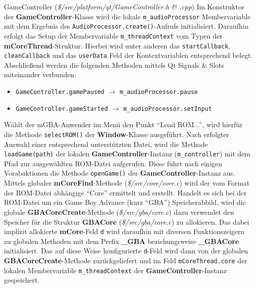 \documentclass[11pt,a4paper]{scrartcl}
\newcommand{\AutorDominik} {
    \vspace{-4mm}
    \large \textbf{Autor:} Dominik Scharnagl \normalsize
    \vspace{2mm}
}
\begin{document}
\vspace{5mm}
\large GameController \normalsize(\textit{\$/src/platform/qt/GameController.h \& .cpp})
\vspace{2mm}\newline
Im Konstruktor der \textbf{GameController}-Klasse wird die lokale \verb|m_audioProcessor| Membervariable mit dem Ergebnis des \verb|AudioProcessor.create()|-Aufrufs initialisiert. Daraufhin erfolgt das Setup der Membervariable \verb|m_threadContext| vom Typen der \textbf{mCoreThread}-Struktur. Hierbei wird unter anderen das \verb|startCallback|, \verb|cleanCallback| und das \verb|userData| Feld der Kontextvariablen entsprechend belegt. Abschlie{\ss}end werden die folgenden Methoden mittels Qt Signals \& Slots miteinander verbunden:

\begin{itemize}
    \item \verb|GameController.gamePaused| $\rightarrow$ \verb|m_audioProcessor.pause|
    \item \verb|GameController.gameStarted| $\rightarrow$ \verb|m_audioProcessor.setInput|
\end{itemize}



W\"ahlt der mGBA-Anwender im Men\"u den Punkt \enquote{Load ROM...}, wird hierf\"ur die Methode \verb|selectROM()| der \textbf{Window}-Klasse ausgef\"uhrt. Nach erfolgter Auswahl einer entsprechend unterst\"utzten Datei, wird die Methode \verb|loadGame(path)|  der lokalen \textbf{GameController}-Instanz (\verb|m_controller|) mit dem Pfad zur ausgew\"ahlten ROM-Datei aufgerufen. Diese f\"uhrt nach einigen Vorabaktionen die Methode \verb|openGame()| der \textbf{GameController}-Instanz aus. Mittels globaler \textbf{mCoreFind}-Methode (\textit{\$/src/core/core.c}) wird der vom Format der ROM-Datei abh\"angige \enquote{Core} ermittelt und erstellt. Handelt es sich bei der ROM-Datei um ein Game Boy Advance (kurz \enquote{GBA}) Speicherabbild, wird die globale \textbf{GBACoreCreate}-Methode (\textit{\$/src/gba/core.c}) dazu verwendet den Speicher f\"ur die Struktur \textbf{GBACore} (\textit{\$/src/gba/core.c}) zu allokieren. Das dabei implizit allokierte \textbf{mCore}-Feld \verb|d| wird daraufhin mit diversen Funktionszeigern zu globalen Methoden mit dem Prefix \textbf{{\_}GBA} beziehungsweise \textbf{{\_}GBACore} initialisiert. Das auf diese Weise konfigurierte \verb|d|-Feld wird dann von der globalen \textbf{GBACoreCreate}-Methode zur\"uckgeliefert und im Feld \verb|mCoreThread.core| der lokalen Membervariable \verb|m_threadContext| der \textbf{GameController}-Instanz gespeichert.
\end{document}
